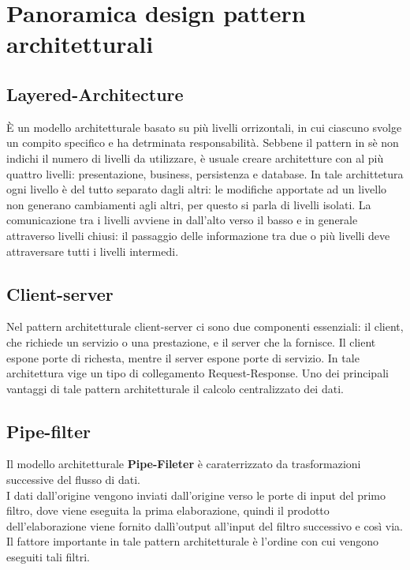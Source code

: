 \documentclass{article}
\begin{document}
\section{Panoramica design pattern architetturali}
\subsection{Layered-Architecture}
È un modello architetturale basato su più livelli orrizontali, in cui ciascuno svolge un compito specifico e ha detrminata responsabilità. Sebbene il pattern in sè non indichi il numero di livelli da utilizzare, è usuale creare architetture con al più quattro livelli: presentazione, business, persistenza e database.
In tale archittetura ogni livello è del tutto separato dagli altri: le modifiche apportate ad un livello non generano cambiamenti agli altri, per questo si parla di livelli isolati.
La comunicazione tra i livelli avviene in dall'alto verso il basso e in generale attraverso livelli chiusi: il passaggio delle informazione tra due o più livelli deve attraversare tutti i livelli intermedi.

\subsection{Client-server}
Nel pattern architetturale client-server ci sono due componenti essenziali: il client, che richiede un servizio o una prestazione, e il server che la fornisce. Il client espone porte di richesta, mentre il server espone porte di servizio. In tale architettura vige un tipo di collegamento Request-Response.
Uno dei principali vantaggi di tale pattern architetturale il calcolo centralizzato dei dati.
\pagebreak
\subsection{Pipe-filter}
Il modello architetturale \textbf{Pipe-Fileter} è caraterrizzato da trasformazioni successive del flusso di dati.
\\
I dati dall'origine vengono inviati dall'origine verso le porte di input del primo filtro, dove viene eseguita la prima elaborazione, quindi il prodotto dell'elaborazione viene fornito dallì'output all'input del filtro successivo e così via.
\\
Il fattore importante in tale pattern architetturale è l'ordine con cui vengono eseguiti tali filtri.
\end{document}
